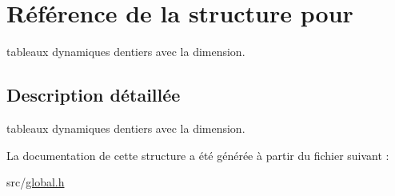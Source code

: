 \hypertarget{structpour}{}\section{Référence de la structure pour}
\label{structpour}


tableaux dynamiques d\textquotesingle{}entiers avec la dimension.  




\subsection{Description détaillée}
tableaux dynamiques d\textquotesingle{}entiers avec la dimension. 

La documentation de cette structure a été générée à partir du fichier suivant \+:\begin{DoxyCompactItemize}
\item 
src/\mbox{\hyperlink{global_8h}{global.\+h}}\end{DoxyCompactItemize}
